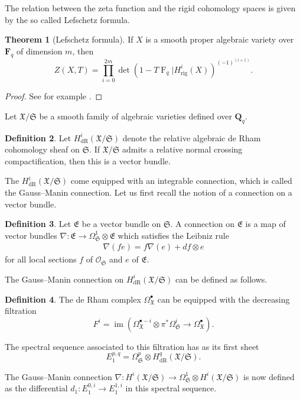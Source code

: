 \documentclass[a4paper,11pt]{article}
\numberwithin{equation}{section}
\newcommand{\QQ}{\mathbf{Q}} %
\newcommand{\FF}{\mathbf{F}} %
\DeclareMathOperator{\fIm}{im}       %
\DeclareMathOperator{\Frob}{F}           %
\providecommand{\HdR}{H_{\text{dR}}}    %
\providecommand{\Hrig}{H_{\text{rig}}}  %
\theoremstyle{definition}
\newtheorem{thm}{Theorem}[section]
\newtheorem{defn}[thm]{Definition}
\begin{document}
The relation between the zeta function and the rigid cohomology spaces is given by the
so called Lefschetz formula.

\begin{thm}[Lefschetz formula] If $X$ is a smooth proper algebraic variety over $\FF_q$ of dimension $m$, 
then \label{thm:Lefschetz}
\[
Z(X,T) = \prod_{i=0}^{2m} \det(1- T \Frob_q | \Hrig^i(X))^{(-1)^{(i+1)}}.
\]
\end{thm}

\begin{proof}
See for example \cite[Theorem 6.3]{EtesseLeStum1993}.
\end{proof}

Let $\mathfrak{X}/\mathfrak{S}$ be a smooth family of algebraic varieties defined over $\QQ_q$.

\begin{defn}
Let $\HdR^i(\mathfrak{X}/\mathfrak{S})$ denote the relative algebraic de Rham cohomology sheaf  
on $\mathfrak{S}$. 
If $\mathfrak{X}/\mathfrak{S}$ admits a relative normal crossing compactification, then 
this is a vector bundle.
\end{defn}

The $\HdR^i(\mathfrak{X}/\mathfrak{S})$ come equipped with an integrable connection, which is called
the Gauss--Manin connection. Let us first recall the notion of a connection on a vector bundle.

\begin{defn}
Let $\mathfrak{E}$ be a vector bundle on $\mathfrak{S}$. A connection on $\mathfrak{E}$ is a map of vector bundles
$\nabla: \mathfrak{E} \rightarrow \Omega^1_{\mathfrak{S}} \otimes \mathfrak{E}$
which satisfies the Leibniz rule
\begin{align*}
\nabla(f e)=f\nabla(e)+df \otimes e
\end{align*} 
for all local sections $f$ of $\mathcal{O}_{\mathfrak{S}}$ and $e$ of $\mathfrak{E}$. 
\end{defn}

The Gauss--Manin connection on $\HdR^i(\mathfrak{X}/\mathfrak{S})$ can be defined as follows.

\begin{defn}
The de Rham complex $\Omega^{\bullet}_{\mathfrak{X}}$ can be equipped with the decreasing
filtration
\[
F^i=\fIm(\Omega^{\bullet-i}_{\mathfrak{X}} \otimes \pi^* \Omega^i_{\mathfrak{S}} \rightarrow \Omega^{\bullet}_{\mathfrak{X}}). 
\]

The spectral sequence associated to this filtration has as its first sheet
\[
E_1^{p,q}=\Omega^p_{\mathfrak{S}} \otimes \HdR^q(\mathfrak{X}/\mathfrak{S}).
\]

The Gauss--Manin connection 
$\nabla:H^i(\mathfrak{X}/\mathfrak{S}) \rightarrow \Omega^1_{\mathfrak{S}} \otimes H^i(\mathfrak{X}/\mathfrak{S})$ 
is now defined as the differential $d_1: E_1^{0,i} \rightarrow E_1^{1,i}$ in this spectral sequence.
\end{defn}
\end{document}

